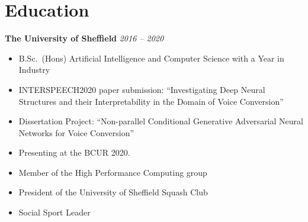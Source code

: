 \documentclass[10pt]{article} %
\begin{document}
\begin{changemargin}{0pt}{0.5pt}
\begin{minipage}[t]{0.5\textwidth}
\begin{changemargin}{5pt}{5pt}

\end{changemargin}
\end{minipage} %
\hfill
\begin{minipage}[t]{0.44\textwidth} %
\vspace{0pt} %



\section{Education}

\begin{changemargin}{5pt}{5pt}

\textbf{The University of Sheffield} \hfill \textit{ 2016 --  2020}
\vspace{-5pt}
\begin{itemize} \itemsep-2pt %
  \item B.Sc.\ (Hons) Artificial Intelligence and Computer Science with a Year in Industry
  \item INTERSPEECH2020 paper submission: \enquote{Investigating Deep Neural Structures and their Interpretability in the Domain of Voice Conversion}
  \item Dissertation Project: \enquote{Non-parallel Conditional Generative Adversarial Neural Networks for Voice Conversion}
  \item Presenting at the BCUR 2020.
  \item Member of the High Performance Computing group
  \item President of the University of Sheffield Squash Club
  \item Social Sport Leader
\end{itemize}

\end{changemargin}



\end{minipage}
\end{changemargin}
\end{document}
